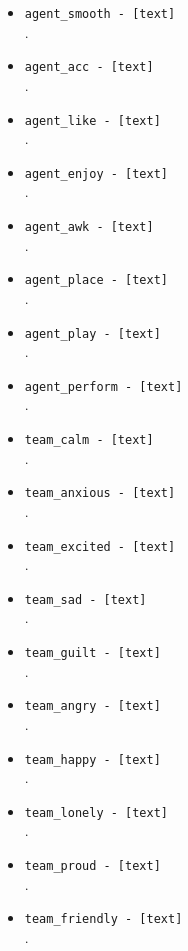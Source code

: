 \begin{description}
\begin{addmargin}[0em]{0em}
\begin{addmargin}[1em]{0em}
\begin{itemize}
            \item \verb|agent_smooth - [text]|\\.
            \item \verb|agent_acc - [text]|\\.
            \item \verb|agent_like - [text]|\\.
            \item \verb|agent_enjoy - [text]|\\.
            \item \verb|agent_awk - [text]|\\.
            \item \verb|agent_place - [text]|\\.
            \item \verb|agent_play - [text]|\\.
            \item \verb|agent_perform - [text]|\\.
            \item \verb|team_calm - [text]|\\.
            \item \verb|team_anxious - [text]|\\.
            \item \verb|team_excited - [text]|\\.
            \item \verb|team_sad - [text]|\\.
            \item \verb|team_guilt - [text]|\\.
            \item \verb|team_angry - [text]|\\.
            \item \verb|team_happy - [text]|\\.
            \item \verb|team_lonely - [text]|\\.
            \item \verb|team_proud - [text]|\\.
            \item \verb|team_friendly - [text]|\\.

\end{itemize}
\end{addmargin}
\end{addmargin}
\end{description}

